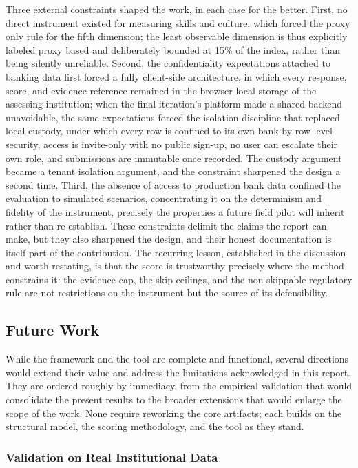 Three external constraints shaped the work, in each case for the better. First, no direct instrument existed for measuring skills and culture, which forced the proxy only rule for the fifth dimension; the least observable dimension is thus explicitly labeled proxy based and deliberately bounded at 15\% of the index, rather than being silently unreliable. Second, the confidentiality expectations attached to banking data first forced a fully client-side architecture, in which every response, score, and evidence reference remained in the browser local storage of the assessing institution; when the final iteration's platform made a shared backend unavoidable, the same expectations forced the isolation discipline that replaced local custody, under which every row is confined to its own bank by row-level security, access is invite-only with no public sign-up, no user can escalate their own role, and submissions are immutable once recorded. The custody argument became a tenant isolation argument, and the constraint sharpened the design a second time. Third, the absence of access to production bank data confined the evaluation to simulated scenarios, concentrating it on the determinism and fidelity of the instrument, precisely the properties a future field pilot will inherit rather than re-establish. These constraints delimit the claims the report can make, but they also sharpened the design, and their honest documentation is itself part of the contribution. The recurring lesson, established in the discussion and worth restating, is that the score is trustworthy precisely where the method constrains it: the evidence cap, the skip ceilings, and the non-skippable regulatory rule are not restrictions on the instrument but the source of its defensibility.

\subsection{Future Work}

While the framework and the tool are complete and functional, several directions would extend their value and address the limitations acknowledged in this report. They are ordered roughly by immediacy, from the empirical validation that would consolidate the present results to the broader extensions that would enlarge the scope of the work. None require reworking the core artifacts; each builds on the structural model, the scoring methodology, and the tool as they stand.

\subsubsection{Validation on Real Institutional Data}

